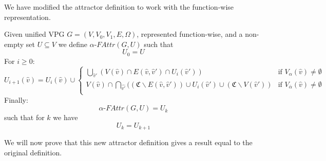 We have modified the attractor definition to work with the function-wise representation.
\begin{definition}
		\label{def_Uattr}Given unified VPG $G = (V, V_0,V_1,E,\Omega)$, represented function-wise, and a non-empty set $U \subseteq V$ we define $\alpha\textit{-FAttr}(G,U)$ such that
	\[U_0 = U \]
	For $i \geq 0$:
	\[
	U_{i+1}(\hat{v}) = U_i(\hat{v}) \cup \begin{cases}
\bigcup_{\hat{v}'} (V(\hat{v}) \cap E(\hat{v},\hat{v}') \cap U_i(\hat{v}')) & \text{if } V_{\alpha}(\hat{v}) \neq \emptyset \\
V(\hat{v}) \cap \bigcap_{\hat{v'}}((\mathfrak{C} \backslash E(\hat{v},\hat{v}')) \cup U_i(\hat{v}') \cup (\mathfrak{C}\backslash V(\hat{v}')) & \text{if } V_{\overline{\alpha}}(\hat{v}) \neq \emptyset \\
	\end{cases}
	\]
	Finally:
	\[\alpha\textit{-FAttr}(G,U) = U_k \]
	such that for $k$ we have
	\[U_k = U_{k+1} \]
\end{definition}
We will now prove that this new attractor definition gives a result equal to the original definition.
